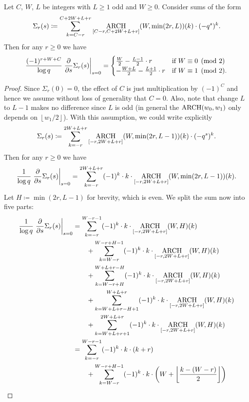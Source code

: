 \begin{lemma}
  \label{lem:derivative_cc}
  Let $C$, $W$, $L$ be integers with $L \ge 1$ odd and $W \ge 0$.
  Consider sums of the form
  \[ \Sigma_r(s) \coloneqq \sum_{k=C-r}^{C+2W+L+r} \operatorname*{ARCH}_{[C-r, C+2W+L+r]}(W, \min(2r, L))(k) \cdot (-q^s)^k. \]
  Then for any $r \ge 0$ we have
  \[ \frac{(-1)^{r+W+C}}{\log q} \left. \pdv{}{s} \Sigma_r(s) \right\rvert_{s=0}
    = \begin{cases}
      \frac W2 - \frac{L-1}{2} \cdot r & \text{if } W \equiv 0 \pmod 2 \\
      - \frac{W+L}{2} - \frac{L+1}{2} \cdot r & \text{if } W \equiv 1 \pmod 2.
    \end{cases} \]
\end{lemma}
\begin{proof}
  Since $\Sigma_r(0) = 0$, the effect of $C$ is just multiplication by $(-1)^C$
  and hence we assume without loss of generality that $C = 0$.
  Also, note that change $L$ to $L-1$ makes no difference since $L$ is odd
  (in general the $\operatorname*{ARCH}(w_0, w_1)$ only depends on $\left\lfloor w_1/2 \right\rfloor$).
  With this assumption, we could write explicitly
  \[ \Sigma_r(s) \coloneqq \sum_{k=-r}^{2W+L+r} \operatorname*{ARCH}_{[-r, 2W+L+r]}(W, \min(2r, L-1))(k) \cdot (-q^s)^k. \]
  Then for any $r \ge 0$ we have
  \[ \frac{1}{\log q} \left. \pdv{}{s} \Sigma_r(s) \right\rvert_{s=0}
    = \sum_{k=-r}^{2W+L+r} (-1)^{k} \cdot k \cdot \operatorname*{ARCH}_{[-r, 2W+L+r]}(W, \min(2r, L-1))(k). \]
  Let $H \coloneqq \min(2r, L-1)$ for brevity, which is even.
  We split the sum now into five parts:
  \begin{align*}
    \frac{1}{\log q} \left. \pdv{}{s} \Sigma_r(s) \right\rvert_{s=0}
    &= \sum_{k=-r}^{W-r-1} (-1)^{k} \cdot k \cdot \Arch_{[-r, 2W+L+r]}(W, H)(k) \\
    &\qquad+ \sum_{k=W-r}^{W-r + H - 1} (-1)^{k} \cdot k \cdot \Arch_{[-r, 2W+L+r]}(W, H)(k) \\
    &\qquad+ \sum_{k=W-r + H}^{W+L+r - H}
      (-1)^{k} \cdot k \cdot \Arch_{[-r, 2W+L+r]}(W, H)(k) \\
    &\qquad+ \sum_{k=W+L+r - H+1}^{W+L+r} (-1)^{k} \cdot k \cdot \Arch_{[-r, 2W+L+r]}(W, H)(k) \\
    &\qquad+ \sum_{k=W+L+r+1}^{2W+L+r} (-1)^{k} \cdot k \cdot \Arch_{[-r, 2W+L+r]}(W, H)(k) \\
    &= \sum_{k=-r}^{W-r-1} (-1)^{k} \cdot k \cdot (k+r) \\
    &\qquad+ \sum_{k=W-r}^{W-r + H - 1} (-1)^{k} \cdot k \cdot
      \left( W + \left\lfloor \frac{k-(W-r)}{2} \right\rfloor \right) \\

\end{align*}
\end{proof}
